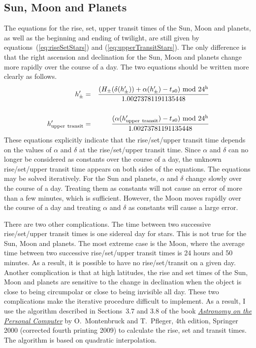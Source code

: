 \documentclass[12pt]{article}
\newcommand \beqn {\begin{eqnarray}}
\newcommand \eeqn {\end{eqnarray}}
\begin{document}
\subsection{Sun, Moon and Planets}

The equations for the rise, set, upper transit times of the Sun, Moon and planets, 
as well as the beginning and ending of twilight, are still given by 
equations~(\ref{eq:riseSetStars}) and (\ref{eq:upperTransitStars}). 
The only difference is that the right ascension and declination for
the Sun, Moon and planets change more rapidly over the course of a day.
The two equations should be written more clearly as follows.
\beqn
  h'_{\pm} &=& \frac{(H_{\pm}(\delta(h'_{\pm})) + \alpha(h'_{\pm}) - t_{s0})
~{\rm mod}~24^{\rm h}}{1.00273781191135448} 
\label{eq:riseSetPlanets} \\ \cr 
  h'_{\rm upper~transit} &=& \frac{(\alpha(h'_{\rm upper~transit}) - t_{s0})
~{\rm mod}~24^{\rm h}}{1.00273781191135448} 
\label{eq:upperTransitPlanets}
\eeqn
These equations explicitly indicate that the rise/set/upper transit time 
depends on the values of $\alpha$ and $\delta$ at the rise/set/upper transit time. 
Since $\alpha$ and $\delta$ can no longer be considered as constants over the 
course of a day, the unknown rise/set/upper transit time appears  
on both sides of the equations. The equations may be solved iteratively. For the 
Sun and planets, $\alpha$ and $\delta$ change slowly over the course of a day. 
Treating them as constants will not cause an error of more than a few minutes, 
which is sufficient. However, the Moon moves rapidly over the course of a day 
and treating $\alpha$ and $\delta$ as constants will cause a large error.

There are two other complications. The time between two successive 
rise/set/upper transit times is one sidereal day for stars. This is not true 
for the Sun, Moon and planets. The most extreme case is the Moon, where the 
average time between two successive rise/set/upper transit times is 24 hours 
and 50 minutes. As a result, it is possible to have no rise/set/transit on 
a given day. Another complication is that at high latitudes, the rise and set 
times of the Sun, Moon and planets are sensitive to the change in declination 
when the object is close to being circumpolar or close to being invisible all day. 
These two complications make the iterative procedure difficult to implement. As 
a result, I use the algorithm described in Sections~3.7 and 3.8 of the book 
\href{https://www.springer.com/us/book/9783540672210#}{\it Astronomy on the 
Personal Computer} by O.~Montenbruck and T.~Pfleger, 4th edition, Springer 2000 
(corrected fourth printing 2009) to calculate the rise, set and transit times. 
The algorithm is based on quadratic interpolation. 
\end{document}
